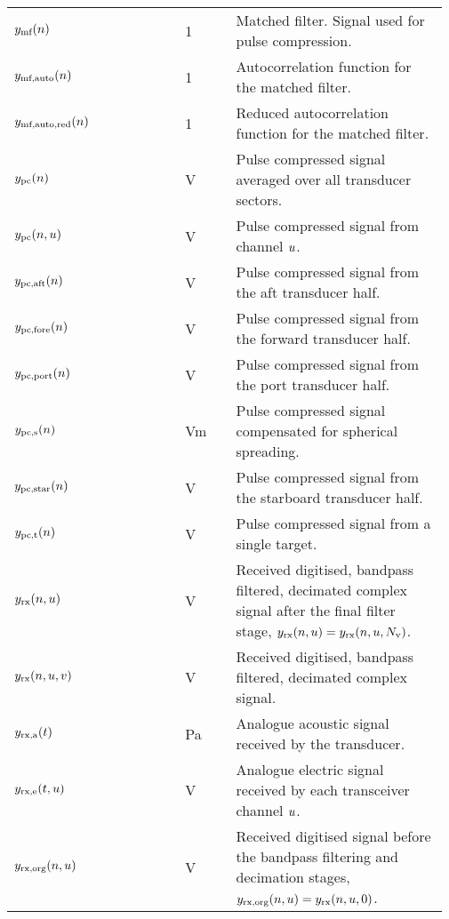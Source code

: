 \documentclass[12pt,a4paper]{article}
\renewcommand{\code}[1]{\texttt{\detokenize{#1}}}
\begin{document}
\begin{longtable}{p{0.15\linewidth} p{0.20\linewidth} p{0.12\linewidth} p{0.5\linewidth} }
$y_{\textrm{mf}}(n)$ & & 1 & Matched filter. Signal used for pulse compression.\\
$y_{\textrm{mf,auto}}(n)$ & & 1 & Autocorrelation function for the matched filter.\\
$y_{\textrm{mf,auto,red}}(n)$ & \code{y_mf_auto_red_n} & 1 & Reduced autocorrelation function for the matched filter.\\

$y_{\textrm{pc}}(n)$ & & V & Pulse compressed signal averaged over all transducer sectors.\\
$y_{\textrm{pc}}(n, u) $ & & V & Pulse compressed signal from channel $u$.\\
$y_{\textrm{pc,aft}}(n)$ & & V & Pulse compressed signal from the aft transducer half.\\
$y_{\textrm{pc,fore}}(n)$ & & V & Pulse compressed signal from the forward transducer half.\\
$y_{\textrm{pc,port}}(n)$ & & V & Pulse compressed signal from the port transducer half.\\
$y_{\textrm{pc,s}}(n)$ & & Vm & Pulse compressed signal compensated for spherical spreading.\\
$y_{\textrm{pc,star}}(n)$ & & V & Pulse compressed signal from the starboard transducer half.\\
$y_{\textrm{pc,t}}(n)$ & & V & Pulse compressed signal from a single target.\\

$y_{\textrm{rx}}(n,u)$ & & V & Received digitised, bandpass filtered, decimated complex signal after the final filter stage, $y_{\textrm{rx}}(n,u) = y_{\textrm{rx}}(n,u,N_{\textrm{v}})$.\\
$y_{\textrm{rx}}(n,u,v)$ & & V & Received digitised, bandpass filtered, decimated complex signal.\\
$y_{\textrm{rx,a}}(t)$ & & Pa & Analogue acoustic signal received by the transducer.\\
$y_{\textrm{rx,e}}(t,u)$ & & V & Analogue electric signal received by each transceiver channel $u$.\\

$y_{\textrm{rx,org}}(n,u)$ & & V & Received digitised signal before the bandpass filtering and decimation stages, $y_{\textrm{rx,org}}(n,u) = y_{\textrm{rx}}(n,u,0)$.\\


\end{longtable}
\end{document}
